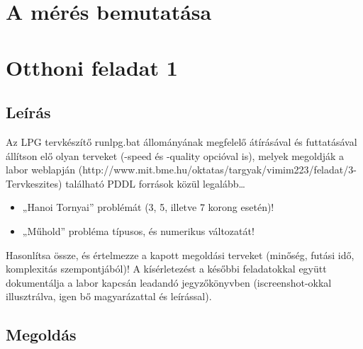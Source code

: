 
\section{A mérés bemutatása}


\section{Otthoni feladat 1}
\subsection{Leírás}
Az LPG tervkészítő runlpg.bat állományának megfelelő átírásával és futtatásával állítson elő olyan terveket (-speed és -quality opcióval is), melyek megoldják a labor weblapján (http://www.mit.bme.hu/oktatas/targyak/vimim223/feladat/3-Tervkeszites) található PDDL források közül legalább… 
\begin{itemize}
\item „Hanoi Tornyai” problémát (3, 5, illetve 7 korong esetén)! 
\item „Műhold” probléma típusos, és numerikus változatát!
\end{itemize}
Hasonlítsa össze, és értelmezze a kapott megoldási terveket (minőség, futási idő, komplexitás szempontjából)!  A kísérletezést a későbbi feladatokkal együtt dokumentálja a labor kapcsán leadandó jegyzőkönyvben (iscreenshot-okkal illusztrálva, igen bő magyarázattal és leírással). 
\subsection{Megoldás}

